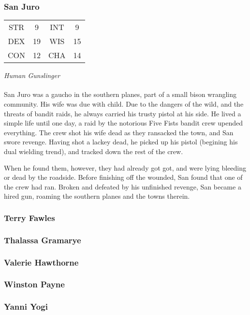\subsubsection{San Juro}
\label{people:david}
\begin{center}
\begin{tabular}{c c|c c}
STR & 9 & INT & 9 \\
DEX & 19 & WIS & 15 \\
CON & 12 & CHA & 14 \end{tabular}\end{center}
\textit{Human Gunslinger}\\
\\
San Juro was a gaucho in the southern planes, part of a small bison wrangling community. His wife was due with child. Due to the dangers of the wild, and the threats of bandit raids, he always carried his trusty pistol at his side. He lived a simple life until one day, a raid by the notorious Five Fists bandit crew upended everything. The crew shot his wife dead as they ransacked the town, and San swore revenge. Having shot a lackey dead, he picked up his pistol (begining his dual wielding trend), and tracked down the rest of the crew.

When he found them, however, they had already got got, and were lying bleeding or dead by the roadside. Before finishing off the wounded, San found that one of the crew had ran. Broken and defeated by his unfinished revenge, San became a hired gun, roaming the southern planes and the towns therein.


\subsubsection{Terry Fawles}
\label{people:fawles}

\subsubsection{Thalassa Gramarye}
\label{people:thalassa}

\subsubsection{Valerie Hawthorne}
\label{people:valerie}

\subsubsection{Winston Payne}
\label{people:wpayne}

\subsubsection{Yanni Yogi}
\label{people:yogi}
